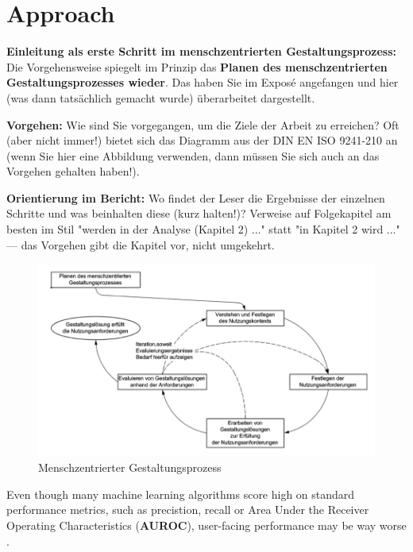 \documentclass[11pt,a4paper,english]{scrreprt}
\newenvironment{comment}
  {\par\medskip
   \begingroup\color{olive}%
   }
 {\endgroup
  \medskip}
\begin{document}
\section{Approach}
\begin{comment}
\textbf{Einleitung als erste Schritt im menschzentrierten Gestaltungsprozess:} Die Vorgehensweise spiegelt im Prinzip das \textbf{Planen des menschzentrierten Gestaltungsprozesses wieder}. Das haben Sie im Exposé angefangen und hier (was dann tatsächlich gemacht wurde) überarbeitet dargestellt.

\textbf{Vorgehen:} Wie sind Sie vorgegangen, um die Ziele der Arbeit zu erreichen? Oft (aber nicht immer!) bietet sich das Diagramm aus der DIN EN ISO 9241-210 an (wenn Sie hier eine Abbildung verwenden, dann müssen Sie sich auch an das Vorgehen gehalten haben!).

\textbf{Orientierung im Bericht:} Wo findet der Leser die Ergebnisse der einzelnen Schritte und was beinhalten diese (kurz halten!)? Verweise auf Folgekapitel am besten im Stil "werden in der Analyse (Kapitel 2) ..." statt "in Kapitel 2 wird ..." — das Vorgehen gibt die Kapitel vor, nicht umgekehrt.
\end{comment}

\begin{figure}[htbp]
    \centering
    \includegraphics[width=\textwidth]{img/Picture1.png}
    \caption{Menschzentrierter Gestaltungsprozess \parencite{DIN}}
    \label{fig:picture1}
\end{figure}

Even though many machine learning algorithms score high on standard performance metrics, such as precistion, recall or Area Under the Receiver Operating Characteristics (\textbf{AUROC}), user-facing performance may be way worse \parencite{gordon_disagreement_2021}. 
\end{document}
